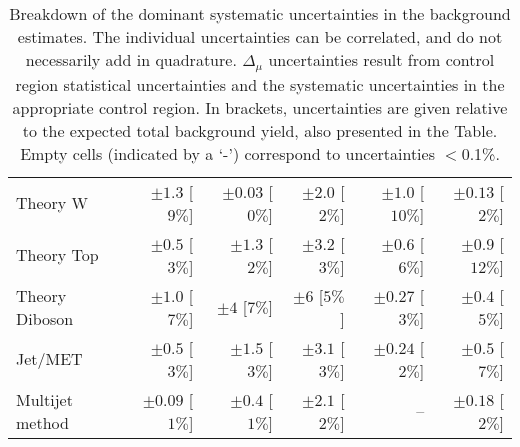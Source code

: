 \begin{table}[tbp]
\begin{center}
\begin{tabular}{|lrrrrr|}
Theory W                          & $\pm 1.3$ [$9\%$]   & $\pm 0.03$ [$0\%$] & $\pm 2.0$ [$2\%$]  & $\pm 1.0$ [$10\%$]  & $\pm 0.13$ [$2\%$]  \\
Theory Top                        & $\pm 0.5$ [$3\%$]   & $\pm 1.3$ [$2\%$]  & $\pm 3.2$ [$3\%$]  & $\pm 0.6$ [$6\%$]   & $\pm 0.9$ [$12\%$]  \\
Theory Diboson                    & $\pm 1.0$ [$7\%$]   & $\pm 4$ [$7\%$]    & $\pm 6$ [$5\%$]    & $\pm 0.27$ [$3\%$]  & $\pm 0.4$ [$5\%$]   \\
Jet/MET                           & $\pm 0.5$ [$3\%$]   & $\pm 1.5$ [$3\%$]  & $\pm 3.1$ [$3\%$]  & $\pm 0.24$ [$2\%$]  & $\pm 0.5$ [$7\%$]   \\
Multijet method                   & $\pm 0.09$ [$1\%$]  & $\pm 0.4$ [$1\%$]  & $\pm 2.1$ [$2\%$]  & --                  & $\pm 0.18$ [$2\%$]  \\
\hline
\end{tabular}

\end{center}
\caption{
Breakdown of the dominant systematic uncertainties in the background estimates.
The individual uncertainties can be correlated, and do not necessarily add in quadrature.
$\Delta_{\mu}$ uncertainties result from control region statistical uncertainties and the systematic uncertainties in the appropriate control region.
In brackets, uncertainties are given relative to the expected total background yield, also presented in the Table. Empty cells (indicated by a `-') correspond to uncertainties $<$0.1\%. \label{tab:BreakdownSysSRCompressed_RJR}}
\end{table}
